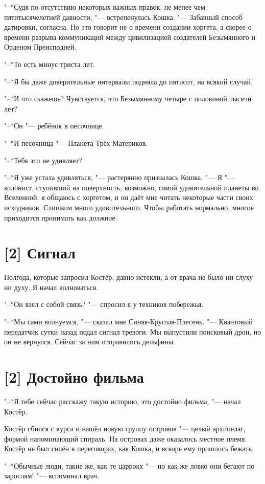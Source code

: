 "--*Судя по отсутствию некоторых важных правок, не менее чем пятитысячелетней давности, "--- встрепенулась Кошка.
"--- Забавный способ датировки, согласна.
Но это говорит не о времени создании хоргета, а скорее о времени разрыва коммуникаций между цивилизацией создателей Безымянного и Орденом Преисподней.

"--*То есть минус триста лет.

"--*Я бы даже доверительные интервалы подняла до пятисот, на всякий случай.

"--*И что скажешь?
Чувствуется, что Безымянному четыре с половиной тысячи лет?

"--*Он "--- ребёнок в песочнице.

"--*И песочница "--- Планета Трёх Материков.

"--*Тебя это не удивляет?

"--*Я уже устала удивляться, "--- растерянно призналась Кошка.
"--- Я "--- колонист, ступивший на поверхность, возможно, самой удивительной планеты во Вселенной, я общаюсь с хоргетом, и он даёт мне читать некоторые части своих исходников.
Слишком много удивительного.
Чтобы работать нормально, многое приходится принимать как должное.

\section{[2] Сигнал}

Полгода, которые запросил Костёр, давно истекли, а от врача не было ни слуху ни духу.
Я начал волноваться.

"--*Он взял с собой связь? "--- спросил я у техников побережья.

"--*Мы сами волнуемся, "--- сказал мне Синяя-Круглая-Плесень.
"--- Квантовый передатчик сутки назад подал сигнал тревоги.
Мы выпустили поисковый дрон, но он не вернулся.
Сейчас за ним отправились дельфины.

\section{[2] Достойно фильма}

"--*Я тебе сейчас расскажу такую историю, это достойно фильма, "--- начал Костёр.

Костёр сбился с курса и нашёл новую группу островов "--- целый архипелаг, формой напоминающий спираль.
На островах даже оказалось местное племя.
Костёр не был силён в переговорах, как Кошка, и вскоре ему пришлось бежать.

"--*Обычные люди, такие же, как те царрокх "--- но как же ловко они бегают по зарослям! "--- вспоминал врач.

